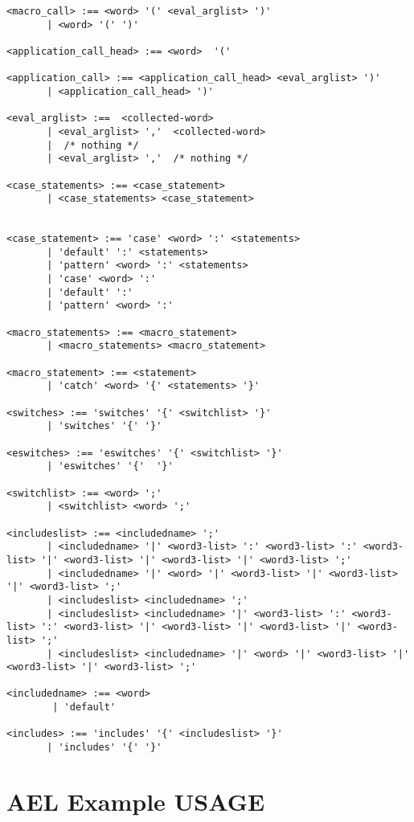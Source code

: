 {\begin{astlisting}
\begin{verbatim}
<macro_call> :== <word> '(' <eval_arglist> ')'
       | <word> '(' ')'

<application_call_head> :== <word>  '('

<application_call> :== <application_call_head> <eval_arglist> ')'
       | <application_call_head> ')'

<eval_arglist> :==  <collected-word>
       | <eval_arglist> ','  <collected-word>
       |  /* nothing */
       | <eval_arglist> ','  /* nothing */

<case_statements> :== <case_statement>
       | <case_statements> <case_statement>


<case_statement> :== 'case' <word> ':' <statements>
       | 'default' ':' <statements>
       | 'pattern' <word> ':' <statements>
       | 'case' <word> ':'
       | 'default' ':'
       | 'pattern' <word> ':'

<macro_statements> :== <macro_statement>
       | <macro_statements> <macro_statement>

<macro_statement> :== <statement>
       | 'catch' <word> '{' <statements> '}'

<switches> :== 'switches' '{' <switchlist> '}'
       | 'switches' '{' '}'

<eswitches> :== 'eswitches' '{' <switchlist> '}'
       | 'eswitches' '{'  '}'

<switchlist> :== <word> ';'
       | <switchlist> <word> ';'

<includeslist> :== <includedname> ';'
       | <includedname> '|' <word3-list> ':' <word3-list> ':' <word3-list> '|' <word3-list> '|' <word3-list> '|' <word3-list> ';'
       | <includedname> '|' <word> '|' <word3-list> '|' <word3-list> '|' <word3-list> ';'
       | <includeslist> <includedname> ';'
       | <includeslist> <includedname> '|' <word3-list> ':' <word3-list> ':' <word3-list> '|' <word3-list> '|' <word3-list> '|' <word3-list> ';'
       | <includeslist> <includedname> '|' <word> '|' <word3-list> '|' <word3-list> '|' <word3-list> ';'

<includedname> :== <word>
        | 'default'

<includes> :== 'includes' '{' <includeslist> '}'
       | 'includes' '{' '}'
\end{verbatim}
\end{astlisting}

\section{AEL Example USAGE}

}
